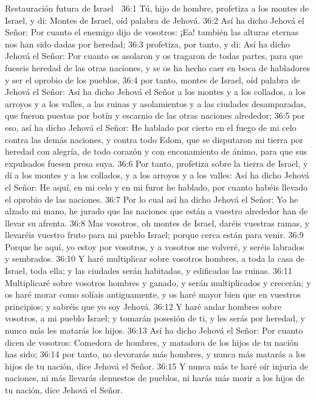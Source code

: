 Restauración futura de Israel  

36:1 Tú, hijo de hombre, profetiza a los montes de Israel, y di: Montes de Israel, oíd palabra de Jehová.  
36:2 Así ha dicho Jehová el Señor: Por cuanto el enemigo dijo de vosotros: ¡Ea! también las alturas eternas nos han sido dadas por heredad;  
36:3 profetiza, por tanto, y di: Así ha dicho Jehová el Señor: Por cuanto os asolaron y os tragaron de todas partes, para que fueseis heredad de las otras naciones, y se os ha hecho caer en boca de habladores y ser el oprobio de los pueblos,  
36:4 por tanto, montes de Israel, oíd palabra de Jehová el Señor: Así ha dicho Jehová el Señor a los montes y a los collados, a los arroyos y a los valles, a las ruinas y asolamientos y a las ciudades desamparadas, que fueron puestas por botín y escarnio de las otras naciones alrededor;  
36:5 por eso, así ha dicho Jehová el Señor: He hablado por cierto en el fuego de mi celo contra las demás naciones, y contra todo Edom, que se disputaron mi tierra por heredad con alegría, de todo corazón y con enconamiento de ánimo, para que sus expulsados fuesen presa suya.  
36:6 Por tanto, profetiza sobre la tierra de Israel, y dí a los montes y a los collados, y a los arroyos y a los valles: Así ha dicho Jehová el Señor: He aquí, en mi celo y en mi furor he hablado, por cuanto habéis llevado el oprobio de las naciones.  
36:7 Por lo cual así ha dicho Jehová el Señor: Yo he alzado mi mano, he jurado que las naciones que están a vuestro alrededor han de llevar su afrenta.  
36:8 Mas vosotros, oh montes de Israel, daréis vuestras ramas, y llevaréis vuestro fruto para mi pueblo Israel; porque cerca están para venir.  
36:9 Porque he aquí, yo estoy por vosotros, y a vosotros me volveré, y seréis labrados y sembrados.  
36:10 Y haré multiplicar sobre vosotros hombres, a toda la casa de Israel, toda ella; y las ciudades serán habitadas, y edificadas las ruinas.  
36:11 Multiplicaré sobre vosotros hombres y ganado, y serán multiplicados y crecerán; y os haré morar como solíais antiguamente, y os haré mayor bien que en vuestros principios; y sabréis que yo soy Jehová.  
36:12 Y haré andar hombres sobre vosotros, a mi pueblo Israel; y tomarán posesión de ti, y les serás por heredad, y nunca más les matarás los hijos.  
36:13 Así ha dicho Jehová el Señor: Por cuanto dicen de vosotros: Comedora de hombres, y matadora de los hijos de tu nación has sido;  
36:14 por tanto, no devorarás más hombres, y nunca más matarás a los hijos de tu nación, dice Jehová el Señor.  
36:15 Y nunca más te haré oír injuria de naciones, ni más llevarás denuestos de pueblos, ni harás más morir a los hijos de tu nación, dice Jehová el Señor.  
